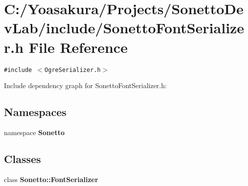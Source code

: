 \section{C:/Yoasakura/Projects/SonettoDevLab/include/SonettoFontSerializer.h File Reference}
\label{_sonetto_font_serializer_8h}
{\tt \#include $<$OgreSerializer.h$>$}\par


Include dependency graph for SonettoFontSerializer.h:\subsection*{Namespaces}
\begin{CompactItemize}
\item 
namespace {\bf Sonetto}
\end{CompactItemize}
\subsection*{Classes}
\begin{CompactItemize}
\item 
class {\bf Sonetto::FontSerializer}
\end{CompactItemize}
